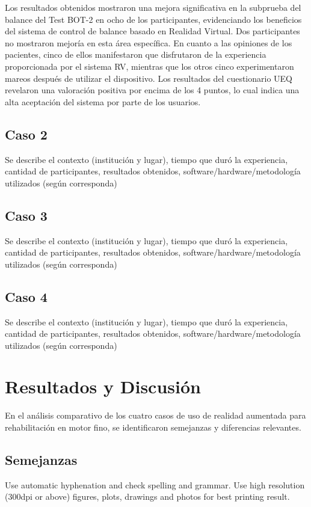 Los resultados obtenidos mostraron una mejora significativa en la subprueba del balance del Test BOT-2 en ocho de los participantes, evidenciando los beneficios del sistema de control de balance basado en Realidad Virtual. Dos participantes no mostraron mejoría en esta área específica. En cuanto a las opiniones de los pacientes, cinco de ellos manifestaron que disfrutaron de la experiencia proporcionada por el sistema RV, mientras que los otros cinco experimentaron mareos después de utilizar el dispositivo. Los resultados del cuestionario UEQ revelaron una valoración positiva por encima de los 4 puntos, lo cual indica una alta aceptación del sistema por parte de los usuarios.


\subsection{Caso 2}
Se describe el contexto (institución y lugar), tiempo que duró la experiencia, cantidad de participantes, resultados obtenidos, software/hardware/metodología utilizados (según corresponda)

\subsection{Caso 3}
Se describe el contexto (institución y lugar), tiempo que duró la experiencia, cantidad de participantes, resultados obtenidos, software/hardware/metodología utilizados (según corresponda)

\subsection{Caso 4}
Se describe el contexto (institución y lugar), tiempo que duró la experiencia, cantidad de participantes, resultados obtenidos, software/hardware/metodología utilizados (según corresponda)
 
\section{Resultados y Discusión}
En el análisis comparativo de los cuatro casos de uso de realidad aumentada para rehabilitación en motor fino, se identificaron semejanzas y diferencias relevantes.

\subsection{Semejanzas}
Use automatic hyphenation and check spelling and grammar. Use high resolution (300dpi or above) figures, plots, drawings and photos for best printing result.

